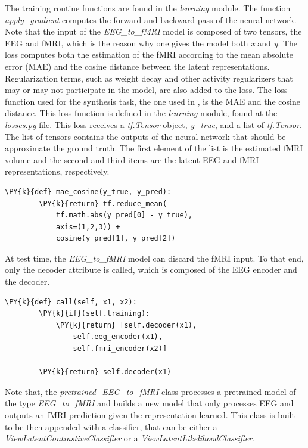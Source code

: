 The training routine functions are found in the \textit{learning} module. The function \textit{apply\_gradient} computes the forward and backward pass of the neural network. Note that the input of the \textit{EEG\_to\_fMRI} model is composed of two tensors, the EEG and fMRI, which is the reason why one gives the model both \textit{x} and \textit{y}. The loss computes both the estimation of the fMRI according to the mean absolute error (MAE) and the cosine distance between the latent representations. Regularization terms, such as weight decay and other activity regularizers that may or may not participate in the model, are also added to the loss. The loss function used for the synthesis task, the one used in \cite{calhas2022eeg}, is the MAE and the cosine distance. This loss function is defined in the \textit{learning} module, found at the \textit{losses.py} file. This loss receives a \textit{tf.Tensor} object, \textit{y\_true}, and a list of \textit{tf.Tensor}. The list of tensors contains the outputs of the neural network that should be approximate the ground truth. The first element of the list is the estimated fMRI volume and the second and third items are the latent EEG and fMRI representations, respectively.
\begin{Verbatim}[commandchars=\\\{\},fontsize=\footnotesize]
    \PY{k}{def} mae_cosine(y_true, y_pred):
        \PY{k}{return} tf.reduce_mean(
            tf.math.abs(y_pred[0] - y_true), 
            axis=(1,2,3)) +
            cosine(y_pred[1], y_pred[2])
\end{Verbatim}
At test time, the \textit{EEG\_to\_fMRI} model can discard the fMRI input. To that end, only the decoder attribute is called, which is composed of the EEG encoder and the decoder. 
\begin{Verbatim}[commandchars=\\\{\},fontsize=\footnotesize]
    \PY{k}{def} call(self, x1, x2):
        \PY{k}{if}(self.training):
            \PY{k}{return} [self.decoder(x1), 
                self.eeg_encoder(x1), 
                self.fmri_encoder(x2)]

        \PY{k}{return} self.decoder(x1)
\end{Verbatim}
Note that, the \textit{pretrained\_EEG\_to\_fMRI} class processes a pretrained model of the type \textit{EEG\_to\_fMRI} and builds a new model that only processes EEG and outputs an fMRI prediction given the representation learned. This class is built to be then appended with a classifier, that can be either a \textit{ViewLatentContrastiveClassifier} or a \textit{ViewLatentLikelihoodClassifier}.

